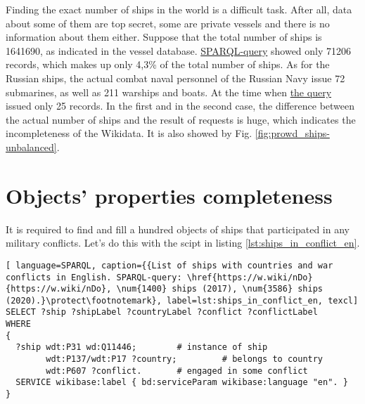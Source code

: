 Finding the exact number of ships in the world is a difficult task. After all, data about some of them are top secret, some are private vessels and there is no information about them either. Suppose that the total number of ships is \num{1641690}, as indicated in the vessel database\cite{FleetMon}. \href{https://w.wiki/koU}{SPARQL-query} showed only \num{71206} records, which makes up only 4,3\%  of the total number of ships. As for the Russian ships, the actual combat naval personnel of the Russian Navy\cite{RussianShips} issue 72 submarines, as well as 211 warships and boats. At the time when \href{https://w.wiki/koS}{the query} issued only 25 records. In the first and in the second case, the difference between the actual number of ships and the result of requests is huge, which indicates the incompleteness of the Wikidata. It is also showed by Fig. \ref{fig:prowd_ships-unbalanced}.



\section{Objects' properties completeness}

It is required to find and fill a hundred objects of ships that participated in any military conflicts. Let's do this with the scipt in listing \ref{lst:ships_in_conflict_en}.
\begin{lstlisting}[ language=SPARQL, caption={{List of ships with countries and war conflicts in English. SPARQL-query: \href{https://w.wiki/nDo}{https://w.wiki/nDo}, \num{1400} ships (2017), \num{3586} ships (2020).}\protect\footnotemark}, label=lst:ships_in_conflict_en, texcl]
SELECT ?ship ?shipLabel ?countryLabel ?conflict ?conflictLabel
WHERE
{
  ?ship wdt:P31 wd:Q11446;        # instance of ship
        wdt:P137/wdt:P17 ?country;         # belongs to country
        wdt:P607 ?conflict.       # engaged in some conflict
  SERVICE wikibase:label { bd:serviceParam wikibase:language "en". }
}
\end{lstlisting}


